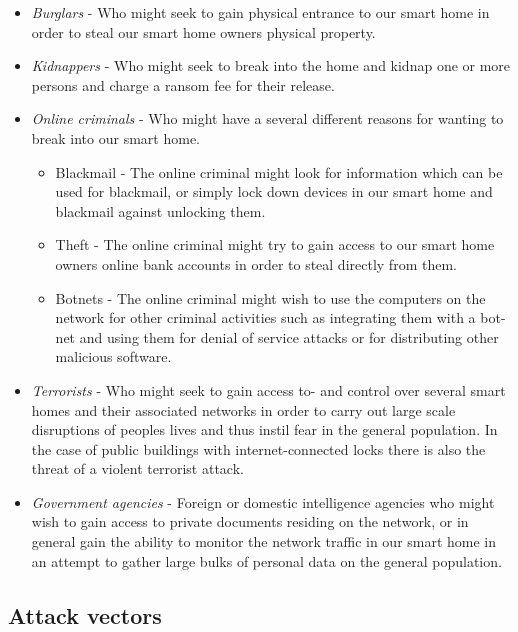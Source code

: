 \documentclass[12pt]{article}
\begin{document}
\begin{itemize}
	\item \textit{Burglars} - Who might seek to gain physical entrance to our smart home in order to steal our smart home owners physical property.
	\item \textit{Kidnappers} - Who might seek to break into the home and kidnap one or more persons and charge a ransom fee for their release.
	\item \textit{Online criminals} - Who might have a several different reasons for wanting to break into our smart home.

	\begin{itemize}
		\item Blackmail - The online criminal might look for information which can be used for blackmail, or simply lock down devices in our smart home and blackmail against unlocking them. 
		\item Theft - The online criminal might try to gain access to our smart home owners online bank accounts in order to steal directly from them.
		\item Botnets - The online criminal might wish to use the computers on the network for other criminal activities such as integrating them with a bot-net and using them for denial of service attacks or for distributing other malicious software. 
	\end{itemize}
	
	\item \textit{Terrorists} - Who might seek to gain access to- and control over several smart homes and their associated networks in order to carry out large scale disruptions of peoples lives and thus instil fear in the general population. In the case of public buildings with internet-connected locks there is also the threat of a violent terrorist attack.
	\item \textit{Government agencies} - Foreign or domestic intelligence agencies who might wish to gain access to private documents residing on the network, or in general gain the ability to monitor the network traffic in our smart home in an attempt to gather large bulks of personal data on the general population.
\end{itemize}

\newpage

\subsection{Attack vectors}
\label{sub:Attack vectors}
\end{document}
